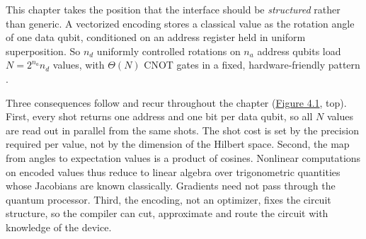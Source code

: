 \documentclass{report}
\theoremstyle{plain}
\theoremstyle{definition}
\theoremstyle{remark}
\begin{document}
This chapter takes the position that the interface should be \emph{structured} rather than generic. A vectorized encoding stores a classical value as the rotation angle of one data qubit, conditioned on an address register held in uniform superposition. So $n_d$ uniformly controlled rotations on $n_a$ address qubits load $N = 2^{n_a} n_d$ values, with $\Theta(N)$ CNOT gates in a fixed, hardware-friendly pattern \cite{mottonen2004ucr,balewski2024qcrank}.

Three consequences follow and recur throughout the chapter (\hyperref[fig:qml:overview]{Figure 4.1}, top). First, every shot returns one address and one bit per data qubit, so all $N$ values are read out in parallel from the same shots. The shot cost is set by the precision required per value, not by the dimension of the Hilbert space. Second, the map from angles to expectation values is a product of cosines. Nonlinear computations on encoded values thus reduce to linear algebra over trigonometric quantities whose Jacobians are known classically. Gradients need not pass through the quantum processor. Third, the encoding, not an optimizer, fixes the circuit structure, so the compiler can cut, approximate and route the circuit with knowledge of the device.
\end{document}
